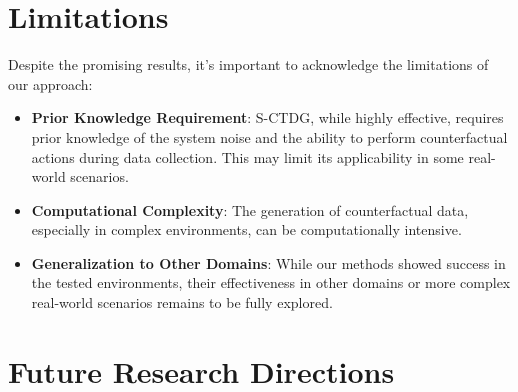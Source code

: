 \section{Limitations}

Despite the promising results, it's important to acknowledge the
limitations of our approach:
\begin{itemize}
    \item \textbf{Prior Knowledge Requirement}: S-CTDG, while
    highly effective, requires prior knowledge of the system
    noise and the ability to perform counterfactual actions
    during data collection. This may limit its applicability
    in some real-world scenarios.
    \item \textbf{Computational Complexity}: The generation of
    counterfactual data, especially in complex environments,
    can be computationally intensive.
    \item \textbf{Generalization to Other Domains}: While our
    methods showed success in the tested environments, their
    effectiveness in other domains or more complex real-world
    scenarios remains to be fully explored.
\end{itemize}

\section{Future Research Directions}

